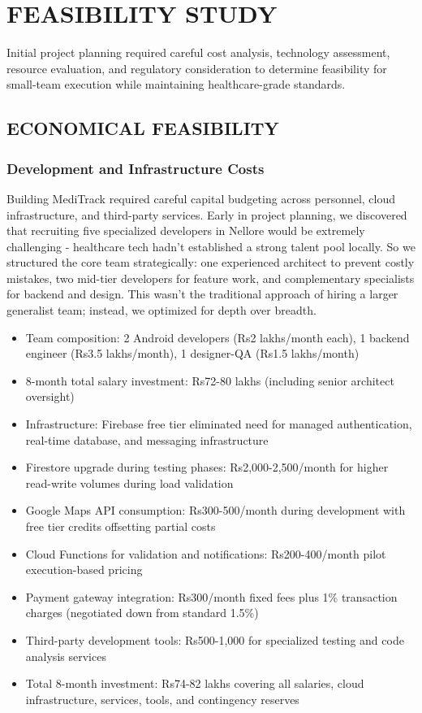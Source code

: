 \documentclass[12pt,a4paper]{report}
\begin{document}
\setcounter{chapter}{1}

\chapter{FEASIBILITY STUDY}

Initial project planning required careful cost analysis, technology assessment, resource evaluation, and regulatory consideration to determine feasibility for small-team execution while maintaining healthcare-grade standards.

\section{ECONOMICAL FEASIBILITY}

\subsection{Development and Infrastructure Costs}

Building MediTrack required careful capital budgeting across personnel, cloud infrastructure, and third-party services. Early in project planning, we discovered that recruiting five specialized developers in Nellore would be extremely challenging - healthcare tech hadn't established a strong talent pool locally. So we structured the core team strategically: one experienced architect to prevent costly mistakes, two mid-tier developers for feature work, and complementary specialists for backend and design. This wasn't the traditional approach of hiring a larger generalist team; instead, we optimized for depth over breadth.

\begin{itemize}
  \item Team composition: 2 Android developers (Rs2 lakhs/month each), 1 backend engineer (Rs3.5 lakhs/month), 1 designer-QA (Rs1.5 lakhs/month)
  \item 8-month total salary investment: Rs72-80 lakhs (including senior architect oversight)
  \item Infrastructure: Firebase free tier eliminated need for managed authentication, real-time database, and messaging infrastructure
  \item Firestore upgrade during testing phases: Rs2,000-2,500/month for higher read-write volumes during load validation
  \item Google Maps API consumption: Rs300-500/month during development with free tier credits offsetting partial costs
  \item Cloud Functions for validation and notifications: Rs200-400/month pilot execution-based pricing
  \item Payment gateway integration: Rs300/month fixed fees plus 1\% transaction charges (negotiated down from standard 1.5\%)
  \item Third-party development tools: Rs500-1,000 for specialized testing and code analysis services
  \item Total 8-month investment: Rs74-82 lakhs covering all salaries, cloud infrastructure, services, tools, and contingency reserves
\end{itemize}
\end{document}
